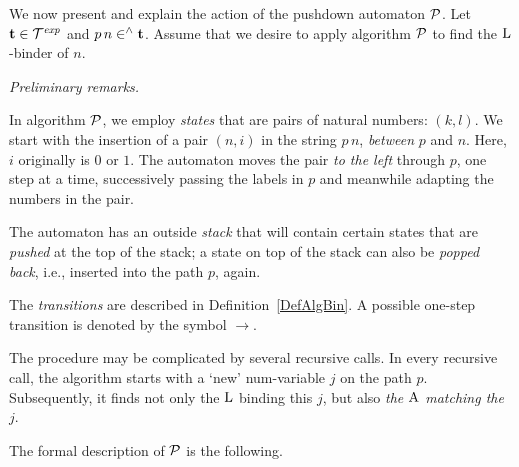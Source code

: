 \documentclass[submission,copyright,creativecommons]{eptcs}
\begin{document}


We now present and explain the action of the pushdown automaton ${\cal P}$. Let ${\bf t} \in {\cal T}^{\it exp}$ and $p \, n \in^{\wedge} {\bf t}$. Assume that we desire to apply algorithm ${\cal P}$ to find the ${\rm L}$-binder of $n$.

\begin{Rem} \label{RemTraPre} {\em Preliminary remarks.}

In algorithm ${\cal P}$, we employ {\it states\/} that are pairs of natural numbers: $(k, l)$. We start with the insertion of a pair $(n,i)$  in the string $p \, n$, {\it between\/} $p$ and $n$. Here, $i$ originally is $0$ or $1$. The automaton moves the pair {\it to the left\/} through $p$, one step at a time, successively passing the labels in $p$ and meanwhile adapting the numbers in the pair.

The automaton has an outside {\it stack\/} that will contain certain states that are {\it pushed\/} at the top of the stack; a state on top of the stack can also be {\it popped back\/}, i.e., inserted into the path $p$, again.

The {\it transitions\/} are described in Definition~\ref{DefAlgBin}. A possible one-step transition is denoted by the symbol $\rightarrow$.

The procedure may be complicated by several recursive calls. In every recursive call, the algorithm starts with a `new' num-variable $j$ on the path $p$. Subsequently, it finds not only the ${\rm L}$ binding this $j$, but also {\em the ${\rm A}$ matching the~$j$}.
\end{Rem}



\smallskip

The formal description of ${\cal P}$ is the following.
\end{document}
